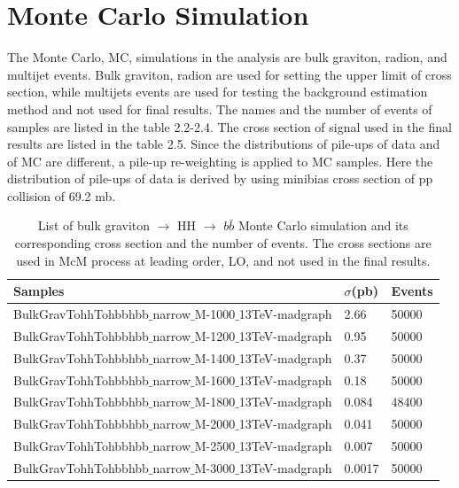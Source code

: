 \section{Monte Carlo Simulation} \label{Monte Carlo Simulation}	
The Monte Carlo, MC, simulations in the analysis are bulk graviton, radion, and multijet events. Bulk graviton, radion are used for setting the upper limit of cross section, while multijets events are used for testing the background estimation method and not used for final results. The names and the number of events of samples are listed in the table 2.2-2.4. The cross section of signal used in the final results are listed in the table 2.5. Since the distributions of pile-ups of data and of MC are different, a pile-up re-weighting is applied to MC samples. Here the distribution of pile-ups of data is derived by using minibias cross section of pp collision of 69.2 mb.%
\begin{table}[h!]
  \begin{center}
    \begin{tabular}{l|l|l}
    Samples & $\sigma$(pb) & Events \\
    \hline
    BulkGravTohhTohbbhbb$\_$narrow$\_$M-1000$\_$13TeV-madgraph & 2.66 & 50000 \\
    BulkGravTohhTohbbhbb$\_$narrow$\_$M-1200$\_$13TeV-madgraph & 0.95 & 50000 \\
    BulkGravTohhTohbbhbb$\_$narrow$\_$M-1400$\_$13TeV-madgraph & 0.37 & 50000 \\
    BulkGravTohhTohbbhbb$\_$narrow$\_$M-1600$\_$13TeV-madgraph & 0.18 & 50000 \\
    BulkGravTohhTohbbhbb$\_$narrow$\_$M-1800$\_$13TeV-madgraph & 0.084 & 48400 \\
    BulkGravTohhTohbbhbb$\_$narrow$\_$M-2000$\_$13TeV-madgraph & 0.041 & 50000 \\
    BulkGravTohhTohbbhbb$\_$narrow$\_$M-2500$\_$13TeV-madgraph & 0.007 & 50000 \\
    BulkGravTohhTohbbhbb$\_$narrow$\_$M-3000$\_$13TeV-madgraph & 0.0017 & 50000 \\
    
    \end{tabular}
  \end{center}

  \caption{List of bulk graviton $\rightarrow$ HH $\rightarrow$ $b\bar{b}$ Monte Carlo simulation and its corresponding cross section and the number of events. The cross sections are used in McM process at leading order, LO, and not used in the final results.}
\end{table} 

